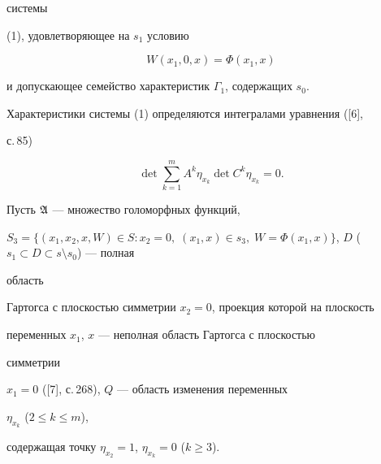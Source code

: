 системы


(1), удовлетворяющее на $s_1$ условию


\begin{equation}


W(x_1,0,x)=\Phi(x_1,x)


\end{equation}


и допускающее семейство характеристик $\Gamma_1$, содержащих $s_0$.





Характеристики системы (1) определяются интегралами уравнения ([6],


с.\,85)


$$


\det\sum^m_{k=1}A^k\eta_{x_k}\det C^k\eta_{x_k}=0.


$$





Пусть $\frak A$ --- множество голоморфных функций,


$S_3=\{(x_1,x_2,x,W)\in S:x_2=0,\;(x_1,x)\in s_3,\;


W=\Phi(x_1,x)\}$, $D$ ($s_1\subset D\subset s\setminus s_0$) --- полная


область


Гартогса с плоскостью симметрии $x_2=0$, проекция которой на плоскость


переменных $x_1$, $x$ --- неполная область Гартогса с плоскостью


симметрии


$x_1=0$ ([7], с.\,268), $Q$ --- область изменения переменных


$\eta_{x_k}$ ($2\le k\le m$),


содержащая точку $\eta_{x_2}=1$, $\eta_{x_k}=0$ ($k\ge 3$).





